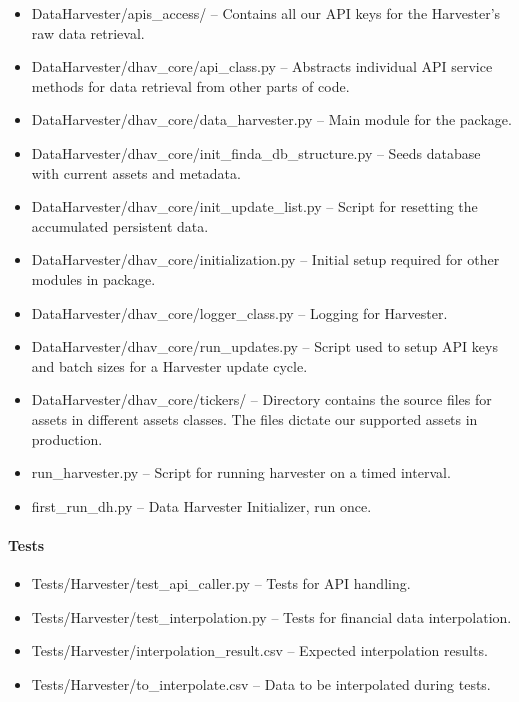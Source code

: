 \documentclass[main.tex]{subfiles}
\begin{document}
\begin{itemize}
\item
  DataHarvester/apis\_access/ -- Contains all our API keys for
  the Harvester's raw data retrieval.
\item
  DataHarvester/dhav\_core/api\_class.py -- Abstracts individual API service methods for data retrieval from other parts of code.
\item
  DataHarvester/dhav\_core/data\_harvester.py -- Main module for the package.
\item
  DataHarvester/dhav\_core/init\_finda\_db\_structure.py -- Seeds
  database with current assets and metadata.
\item
  DataHarvester/dhav\_core/init\_update\_list.py -- Script for resetting the accumulated persistent data.
\item
  DataHarvester/dhav\_core/initialization.py -- Initial setup required for other modules in package.
\item
  DataHarvester/dhav\_core/logger\_class.py -- Logging for Harvester.
\item
  DataHarvester/dhav\_core/run\_updates.py -- Script used to setup API keys and batch sizes for a Harvester update cycle.
\item
  DataHarvester/dhav\_core/tickers/ -- Directory contains the source files for assets in different assets classes. The files dictate our supported assets in production.
\item
  run\_harvester.py -- Script for running harvester on a timed interval.
\item
  first\_run\_dh.py -- Data Harvester Initializer, run once.
\end{itemize}

\paragraph{Tests}
\label{tests-1}

\begin{itemize}

\item
  Tests/Harvester/test\_api\_caller.py -- Tests for API handling.
\item
  Tests/Harvester/test\_interpolation.py -- Tests for financial data interpolation.
\item
  Tests/Harvester/interpolation\_result.csv -- Expected interpolation results.
\item
  Tests/Harvester/to\_interpolate.csv -- Data to be interpolated during tests.
\end{itemize}
\end{document}
